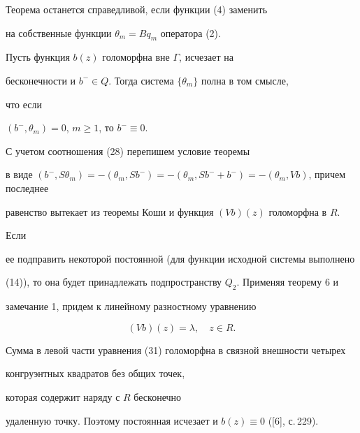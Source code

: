  


\begin{note} 


Теорема останется справедливой, если функции (4) заменить 


на собственные функции $\theta_m=Bq_m$ оператора (2). 


\end{note} 


 


 


\begin{thm} 


Пусть функция $b(z)$ голоморфна вне $\Gamma$, исчезает на 


бесконечности и $b^-\in Q$. Тогда система $\{\theta_m\}$ полна в том смысле, 


что если 


$(b^-,\theta_m)=0$, $m\ge1$, то $b^-\equiv0$. 


\end{thm} 


 


 


\begin{pf} 


С учетом соотношения (28) перепишем условие теоремы 


в виде $(b^-,S\theta_m)=-(\theta_m,Sb^-)= -(\theta_m,Sb^-+b^-)= 


-(\theta_m,Vb)$, причем последнее 


равенство вытекает из теоремы Коши и функция $(Vb)(z)$ голоморфна в $R$. 


Если 


ее подправить некоторой постоянной (для функции исходной системы выполнено 


(14)), то она будет принадлежать подпространству $Q_2$. Применяя теорему 6 и 


замечание 1, придем к линейному разностному уравнению 


\begin{equation} 


(Vb)(z)=\lambda,\quad z\in R. 


\end{equation} 


Сумма в левой части уравнения (31) голоморфна в связной внешности четырех 


конгруэнтных квадратов без общих точек,


которая содержит наряду с $R$ бесконечно 


удаленную точку. Поэтому постоянная исчезает и $b(z)\equiv0$ ([6], с.\,229). 


\end{pf} 


